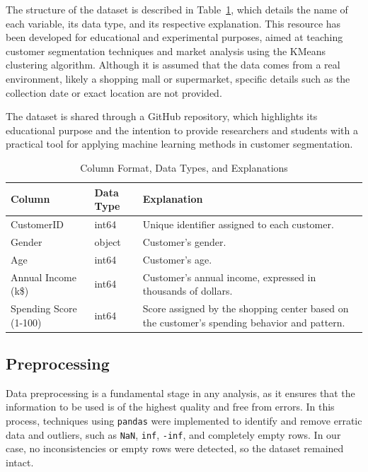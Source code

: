 \documentclass[10pt]{article}
\begin{document}
The structure of the dataset is described in Table~\ref{tab:columnas}, which details the name of each variable, its data type, and its respective explanation. This resource has been developed for educational and experimental purposes, aimed at teaching customer segmentation techniques and market analysis using the KMeans clustering algorithm. Although it is assumed that the data comes from a real environment, likely a shopping mall or supermarket, specific details such as the collection date or exact location are not provided.

The dataset is shared through a GitHub repository, which highlights its educational purpose and the intention to provide researchers and students with a practical tool for applying machine learning methods in customer segmentation.

\begin{table}[h]
    \centering
    \caption{Column Format, Data Types, and Explanations}
    \begin{tabular}{ll>{\raggedright\arraybackslash}p{7cm}}
        \toprule
        \textbf{Column} & \textbf{Data Type} & \textbf{Explanation} \\
        \midrule
        CustomerID             & int64   & Unique identifier assigned to each customer. \\
        Gender                 & object  & Customer's gender. \\
        Age                    & int64   & Customer's age. \\
        Annual Income (k\$)    & int64   & Customer's annual income, expressed in thousands of dollars. \\
        Spending Score (1-100) & int64   & Score assigned by the shopping center based on the customer’s spending behavior and pattern. \\
        \bottomrule
    \end{tabular}
    \label{tab:columnas}
\end{table}

\subsection{Preprocessing}

Data preprocessing is a fundamental stage in any analysis, as it ensures that the information to be used is of the highest quality and free from errors. In this process, techniques using \texttt{pandas} were implemented to identify and remove erratic data and outliers, such as \texttt{NaN}, \texttt{inf}, \texttt{-inf}, and completely empty rows. In our case, no inconsistencies or empty rows were detected, so the dataset remained intact.
\end{document}

